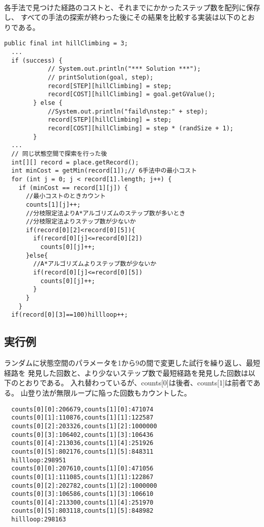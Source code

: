 \documentclass{jarticle}
\begin{document}
\paragraph{}
各手法で見つけた経路のコストと、それまでにかかったステップ数を配列に保存し、
すべての手法の探索が終わった後にその結果を比較する実装は以下のとおりである。

\begin{lstlisting}[caption=結果を保存し、比較]
	public final int hillClimbing = 3;
  ...
  if (success) {
			// System.out.println("*** Solution ***");
			// printSolution(goal, step);
			record[STEP][hillClimbing] = step;
			record[COST][hillClimbing] = goal.getGValue();
		} else {
			//System.out.println("faild\nstep:" + step);
			record[STEP][hillClimbing] = step;
			record[COST][hillClimbing] = step * (randSize + 1);
		}
  ...
  // 同じ状態空間で探索を行った後
  int[][] record = place.getRecord();
  int minCost = getMin(record[1]);// 6手法中の最小コスト
  for (int j = 0; j < record[1].length; j++) {
    if (minCost == record[1][j]) {
      //最小コストのときカウント
      counts[1][j]++;
      //分枝限定法よりA*アルゴリズムのステップ数が多いとき
      //分枝限定法よりステップ数が少ないか
      if(record[0][2]<record[0][5]){
        if(record[0][j]<=record[0][2])
          counts[0][j]++;
      }else{
        //A*アルゴリズムよりステップ数が少ないか
        if(record[0][j]<=record[0][5])
          counts[0][j]++;
        }
      }
    }
  if(record[0][3]==100)hillloop++;

\end{lstlisting}

\subsection{実行例}
ランダムに状態空間のパラメータを1から9の間で変更した試行を繰り返し、最短経路を
発見した回数と、より少ないステップ数で最短経路を発見した回数は以下のとおりである。
入れ替わっているが、counts[0]は後者、counts[1]は前者である。
山登り法が無限ループに陥った回数もカウントした。

\begin{lstlisting}
  counts[0][0]:206679,counts[1][0]:471074
  counts[0][1]:110876,counts[1][1]:122587
  counts[0][2]:203326,counts[1][2]:1000000
  counts[0][3]:106402,counts[1][3]:106436
  counts[0][4]:213036,counts[1][4]:251926
  counts[0][5]:802176,counts[1][5]:848311
  hillloop:298951
  counts[0][0]:207610,counts[1][0]:471056
  counts[0][1]:111085,counts[1][1]:122867
  counts[0][2]:202782,counts[1][2]:1000000
  counts[0][3]:106586,counts[1][3]:106610
  counts[0][4]:213300,counts[1][4]:251970
  counts[0][5]:803118,counts[1][5]:848982
  hillloop:298163
\end{lstlisting}
\end{document}
